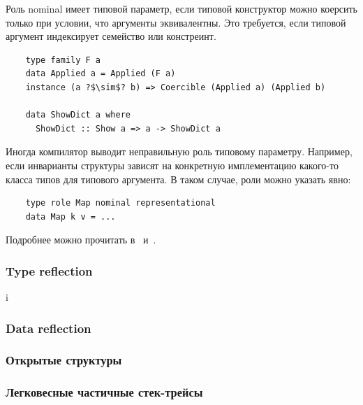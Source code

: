 Роль nominal имеет типовой параметр, если типовой конструктор можно коерсить только при условии, что аргументы эквивалентны.
Это требуется, если типовой аргумент индексирует семейство или констреинт.
\begin{verbatim}
    type family F a
    data Applied a = Applied (F a)
    instance (a ?$\sim$? b) => Coercible (Applied a) (Applied b)

    data ShowDict a where
      ShowDict :: Show a => a -> ShowDict a
\end{verbatim}

Иногда компилятор выводит неправильную роль типовому параметру.
Например, если инварианты структуры зависят на конкретную имплементацию какого-то класса типов для типового аргумента.
В таком случае, роли можно указать явно:
\begin{verbatim}
    type role Map nominal representational
    data Map k v = ...
\end{verbatim}

Подробнее можно прочитать в~\cite{breitner2014safe} и~\cite[глава 8]{maguire-types}.

\subsubsection{Type reflection}

i\cite{peyton2016reflection}



\subsubsection{Data reflection}




\subsubsection{Открытые структуры}




\subsubsection{Легковесные частичные стек-трейсы}

